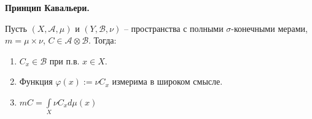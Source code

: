 \begin{theorem}
    \textbf{Принцип Кавальери.}

    Пусть $(X, \mathcal{A}, \mu)$ и $(Y, \mathcal{B}, \nu)$ – пространства с полными $\sigma$-конечными мерами, $m=\mu\times\nu$,
    $C\in \mathcal{A}\otimes \mathcal{B}$. Тогда:

    \begin{enumerate}
        \item $C_x\in \mathcal{B}$ при п.в. $x\in X$.
        
        \item Функция $\varphi (x) := \nu C_x$ измерима в широком смысле.
        
        \item $m C=\int\limits_X \nu C_x d\mu (x)$
    \end{enumerate}
\end{theorem}

